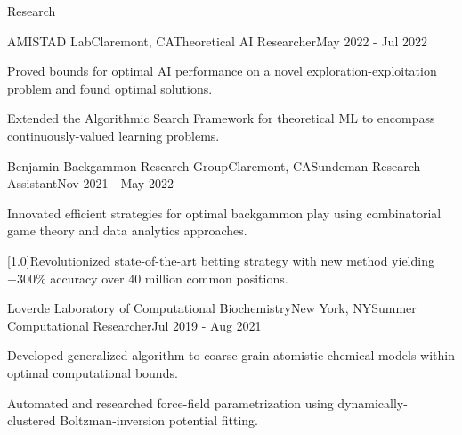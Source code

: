 \documentclass{ForrestBickerResume}
\begin{document}
    \begin{rSection}{Research}

    \begin{rSubsection}{AMISTAD Lab}{Claremont, CA}{Theoretical AI Researcher}{May 2022 - Jul 2022}{}
        \item Proved bounds for optimal AI performance on a novel exploration-exploitation problem and found optimal solutions.
        \item Extended the Algorithmic Search Framework for theoretical ML to encompass continuously-valued learning problems.
    \end{rSubsection}


        \begin{rSubsection}{Benjamin Backgammon Research Group}{Claremont, CA}{Sundeman Research Assistant}{Nov 2021 - May 2022}{}
            \item Innovated efficient strategies for optimal backgammon play using combinatorial game theory and data analytics approaches.
            \item \scalebox{.97}[1.0]{Revolutionized state-of-the-art betting strategy with new method yielding +300\% accuracy over 40 million common positions.}
        \end{rSubsection}
    
        \begin{rSubsection}{Loverde Laboratory of Computational Biochemistry}{New York, NY}{Summer Computational Researcher}{Jul 2019 - Aug 2021}{}
            \item Developed generalized algorithm to coarse-grain atomistic chemical models within optimal computational bounds.
            \item Automated and researched force-field parametrization using dynamically-clustered Boltzman-inversion potential fitting.
        \end{rSubsection}    


\end{rSection}
\end{document}

